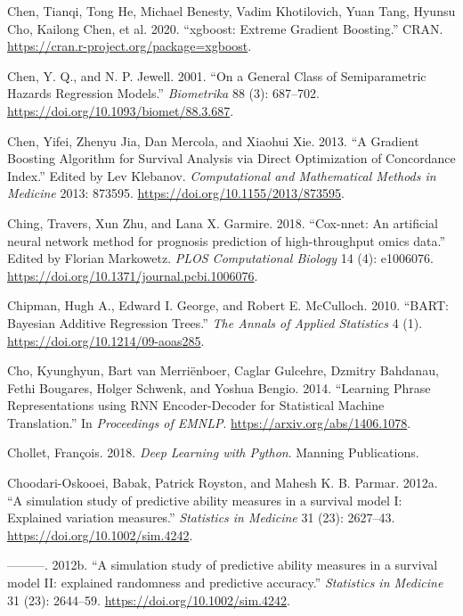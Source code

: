 \documentclass[
  letterpaper,
  krantz2]{style/krantz}
\newlength{\cslhangindent}
\newenvironment{CSLReferences}[2] %
 {\begin{list}{}{%
  \setlength{\itemindent}{0pt}
  \setlength{\leftmargin}{0pt}
  \setlength{\parsep}{0pt}
  \ifodd #1
   \setlength{\leftmargin}{\cslhangindent}
   \setlength{\itemindent}{-1\cslhangindent}
  \fi
  \setlength{\itemsep}{#2\baselineskip}}}
 {\end{list}}
\begin{document}
\begin{CSLReferences}{1}{0}
Chen, Tianqi, Tong He, Michael Benesty, Vadim Khotilovich, Yuan Tang,
Hyunsu Cho, Kailong Chen, et al. 2020. {``{xgboost: Extreme Gradient
Boosting}.''} CRAN. \url{https://cran.r-project.org/package=xgboost}.

Chen, Y. Q., and N. P. Jewell. 2001. {``On a General Class of
Semiparametric Hazards Regression Models.''} \emph{Biometrika} 88 (3):
687--702. \url{https://doi.org/10.1093/biomet/88.3.687}.

Chen, Yifei, Zhenyu Jia, Dan Mercola, and Xiaohui Xie. 2013. {``{A
Gradient Boosting Algorithm for Survival Analysis via Direct
Optimization of Concordance Index}.''} Edited by Lev Klebanov.
\emph{Computational and Mathematical Methods in Medicine} 2013: 873595.
\url{https://doi.org/10.1155/2013/873595}.

Ching, Travers, Xun Zhu, and Lana X. Garmire. 2018. {``{Cox-nnet: An
artificial neural network method for prognosis prediction of
high-throughput omics data}.''} Edited by Florian Markowetz. \emph{PLOS
Computational Biology} 14 (4): e1006076.
\url{https://doi.org/10.1371/journal.pcbi.1006076}.

Chipman, Hugh A., Edward I. George, and Robert E. McCulloch. 2010.
{``BART: Bayesian Additive Regression Trees.''} \emph{The Annals of
Applied Statistics} 4 (1). \url{https://doi.org/10.1214/09-aoas285}.

Cho, Kyunghyun, Bart van Merriënboer, Caglar Gulcehre, Dzmitry Bahdanau,
Fethi Bougares, Holger Schwenk, and Yoshua Bengio. 2014. {``{Learning
Phrase Representations using RNN Encoder-Decoder for Statistical Machine
Translation}.''} In \emph{Proceedings of EMNLP}.
\url{https://arxiv.org/abs/1406.1078}.

Chollet, François. 2018. \emph{Deep Learning with Python}. Manning
Publications.

Choodari-Oskooei, Babak, Patrick Royston, and Mahesh K. B. Parmar.
2012a. {``{A simulation study of predictive ability measures in a
survival model I: Explained variation measures}.''} \emph{Statistics in
Medicine} 31 (23): 2627--43. \url{https://doi.org/10.1002/sim.4242}.

---------. 2012b. {``{A simulation study of predictive ability measures
in a survival model II: explained randomness and predictive
accuracy}.''} \emph{Statistics in Medicine} 31 (23): 2644--59.
\url{https://doi.org/10.1002/sim.4242}.


\end{CSLReferences}
\end{document}
